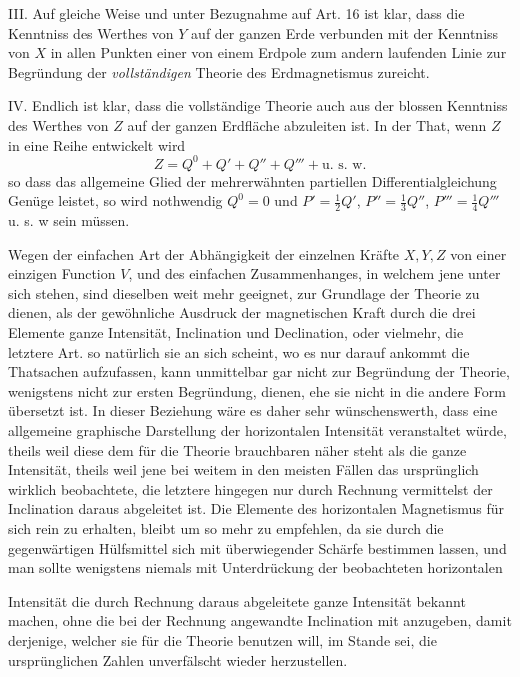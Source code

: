 III. Auf gleiche Weise und unter Bezugnahme auf Art. 16 ist klar, dass die Kenntniss des Werthes von $Y$ auf der ganzen Erde verbunden mit der Kenntniss von $X$ in allen Punkten einer von einem Erdpole zum andern laufenden Linie zur Begründung der \textit{vollständigen} Theorie des Erdmagnetismus zureicht.

IV. Endlich ist klar, dass die vollständige Theorie auch aus der blossen Kenntniss des Werthes von $Z$ auf der ganzen Erdfläche abzuleiten ist. In der That, wenn $Z$ in eine Reihe entwickelt wird
\[
Z=Q^0+Q'+Q''+Q'''+\text{u. s. w.}
\]
so dass das allgemeine Glied der mehrerwähnten partiellen Differentialgleichung Genüge leistet, so wird nothwendig $Q^0=0$ und $P'=\frac12Q'$, $P''=\frac13Q''$, $P'''=\frac14Q'''$ u. s. w sein müssen.

Wegen der einfachen Art der Abhängigkeit der einzelnen Kräfte $X,Y,Z$ von einer einzigen Function $V$, und des einfachen Zusammenhanges, in welchem jene unter sich stehen, sind dieselben weit mehr geeignet, zur Grundlage der Theorie zu dienen, als der gewöhnliche Ausdruck der magnetischen Kraft durch die drei Elemente ganze Intensität, Inclination und Declination, oder vielmehr, die letztere Art. so natürlich sie an sich scheint, wo es nur darauf ankommt die Thatsachen aufzufassen, kann unmittelbar gar nicht zur Begründung der Theorie, wenigstens nicht zur ersten Begründung, dienen, ehe sie nicht in die andere Form übersetzt ist. In dieser Beziehung wäre es daher sehr wünschenswerth, dass eine allgemeine graphische Darstellung der horizontalen Intensität veranstaltet würde, theils weil diese dem für die Theorie brauchbaren näher steht als die ganze Intensität, theils weil jene bei weitem in den meisten Fällen das ursprünglich wirklich beobachtete, die letztere hingegen nur durch Rechnung vermittelst der Inclination daraus abgeleitet ist. Die Elemente des horizontalen Magnetismus für sich rein zu erhalten, bleibt um so mehr zu empfehlen, da sie durch die gegenwärtigen Hülfsmittel sich mit überwiegender Schärfe bestimmen lassen, und man sollte wenigstens niemals mit Unterdrückung der beobachteten horizontalen
\par\clearpage
{}
\noindent Intensität die durch Rechnung daraus abgeleitete ganze Intensität bekannt machen, ohne die bei der Rechnung angewandte Inclination mit anzugeben, damit derjenige, welcher sie für die Theorie benutzen will, im Stande sei, die ursprünglichen Zahlen unverfälscht wieder herzustellen.


